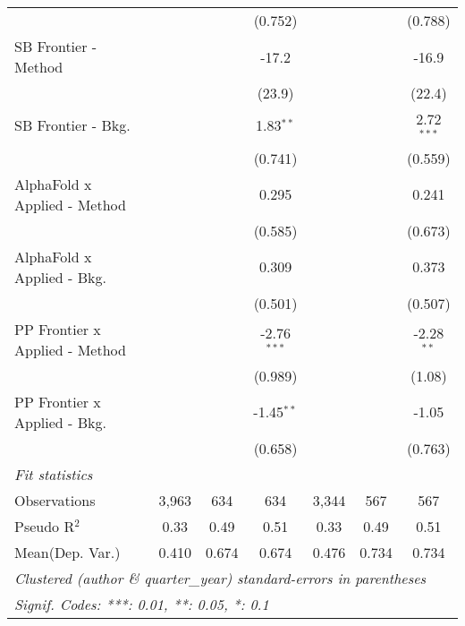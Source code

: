 \begin{tabular}{lcccccc}
                                  &                &               & (0.752)       &                &              & (0.788)\\   
   SB Frontier - Method           &                &               & -17.2         &                &              & -16.9\\   
                                  &                &               & (23.9)        &                &              & (22.4)\\   
   SB Frontier - Bkg.             &                &               & 1.83$^{**}$   &                &              & 2.72$^{***}$\\   
                                  &                &               & (0.741)       &                &              & (0.559)\\   
   AlphaFold x Applied - Method   &                &               & 0.295         &                &              & 0.241\\   
                                  &                &               & (0.585)       &                &              & (0.673)\\   
   AlphaFold x Applied - Bkg.     &                &               & 0.309         &                &              & 0.373\\   
                                  &                &               & (0.501)       &                &              & (0.507)\\   
   PP Frontier x Applied - Method &                &               & -2.76$^{***}$ &                &              & -2.28$^{**}$\\   
                                  &                &               & (0.989)       &                &              & (1.08)\\   
   PP Frontier x Applied - Bkg.   &                &               & -1.45$^{**}$  &                &              & -1.05\\   
                                  &                &               & (0.658)       &                &              & (0.763)\\   
   \midrule
   \emph{Fit statistics}\\
   Observations                   & 3,963          & 634           & 634           & 3,344          & 567          & 567\\  
   Pseudo R$^2$                   & 0.33           & 0.49          & 0.51          & 0.33           & 0.49         & 0.51\\  
Mean(Dep. Var.) & 0.410 & 0.674 & 0.674 & 0.476 & 0.734 & 0.734 \\
   \midrule \midrule
   \multicolumn{7}{l}{\emph{Clustered (author \& quarter\_year) standard-errors in parentheses}}\\
   \multicolumn{7}{l}{\emph{Signif. Codes: ***: 0.01, **: 0.05, *: 0.1}}\\
\end{tabular}
\par\endgroup
